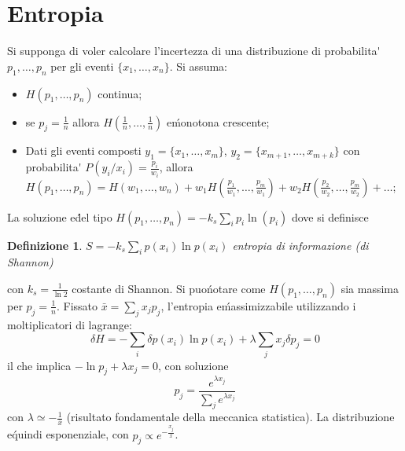 \documentclass[12pt, a4paper]{book}
\theoremstyle{theorem}
\newtheorem{definition}{Definizione}[section]
\begin{document}
		\section{Entropia}
			Si supponga di voler calcolare l'incertezza di una distribuzione di probabilita\' $p_{1},\ldots,p_{n}$ per gli eventi $\{x_{1},\ldots,x_{n}\}$.
			Si assuma:
			\begin{itemize}
				\item $H(p_{1},\ldots,p_{n})$ continua;
				\item se $p_{j}=\frac{1}{n}$ allora $H(\frac{1}{n},\ldots,\frac{1}{n})$ e\' monotona crescente;
				\item Dati gli eventi composti $y_{1}=\{x_{1},\ldots,x_{m}\}$, $y_{2}=\{x_{m+1},\ldots,x_{m+k}\}$ con probabilita\' $P(y_{i}/x_{i})=\frac{p_{i}}{w_{i}}$, allora 
					\\$H(p_{1},\ldots,p_{n})=H(w_{1},\ldots,w_{n})+w_{1}H\left(\frac{p_{1}}{w_{1}},\ldots,\frac{p_{m}}{w_{1}}\right)+w_{2}H\left(\frac{p_{2}}{w_{2}},\ldots,\frac{p_{m}}{w_{2}}\right)+\ldots$;
			\end{itemize}
			La soluzione e\' del tipo $H(p_{1},\ldots,p_{n})=-k_{s}\sum_{i}p_{i}\ln(p_{i})$ dove si definisce
			\begin{definition}
				$S=-k_{s}\sum_{i}p(x_i)\ln p(x_i)$ entropia di informazione (di Shannon)
				\label{equation:entropia}
			\end{definition}
			con $k_{s}=\frac{1}{\ln2}$ costante di Shannon.
			Si puo\' notare come $H(p_{1},\ldots,p_{n})$ sia massima per $p_{j}=\frac{1}{n}$.
			Fissato $\bar{x}=\sum_{j}x_{j}p_{j}$, l'entropia e\' massimizzabile utilizzando i moltiplicatori di lagrange:
			\begin{equation*}
				\delta H=-\sum_{i}\delta p(x_i)\ln p(x_i)+\lambda\sum_{j}x_{j}\delta p_{j}=0
			\end{equation*}
			il che implica $-\ln p_{j}+\lambda x_{j}=0$, con soluzione
			\begin{equation}
				p_{j}=\frac{e^{\lambda x_{j}}}{\sum_{j}e^{\lambda x_{j}}}
			\end{equation}
			con $\lambda\simeq -\frac{1}{\bar{x}}$ (risultato fondamentale della meccanica statistica).
			La distribuzione e\' quindi esponenziale, con $p_{j}\propto e^{-\frac{x_{j}}{\bar{x}}}$.
		
\end{document}
